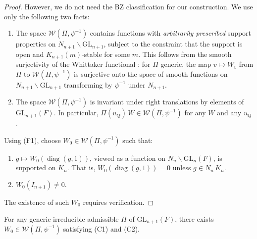 \begin{proof}
However, we do not need the BZ classification for our construction. We use
only the following two facts:
\begin{enumerate}
\item[(F1)] The space $\mathcal{W}(\Pi, \psi^{-1})$ contains functions with
  \emph{arbitrarily prescribed} support properties on $N_{n+1} \backslash \mathrm{GL}_{n+1}$,
  subject to the constraint that the support is open and $K_{n+1}(m)$-stable
  for some $m$. This follows from the smooth surjectivity of the Whittaker
  functional \cite{Shalika74}: for $\Pi$ generic, the map
  $v \mapsto W_v$ from $\Pi$ to $\mathcal{W}(\Pi, \psi^{-1})$ is surjective
  onto the space of smooth functions on $N_{n+1} \backslash \mathrm{GL}_{n+1}$
  transforming by $\psi^{-1}$ under $N_{n+1}$.
\item[(F2)] The space $\mathcal{W}(\Pi, \psi^{-1})$ is invariant under right
  translations by elements of $\mathrm{GL}_{n+1}(F)$. In particular,
  $\Pi(u_Q)\,W \in \mathcal{W}(\Pi, \psi^{-1})$ for any $W$ and any $u_Q$.
\end{enumerate}

Using (F1), choose $W_0 \in \mathcal{W}(\Pi, \psi^{-1})$ such that:
\begin{enumerate}
\item[(C1)] $g \mapsto W_0(\operatorname{diag}(g,1))$, viewed as a function
  on $N_n \backslash \mathrm{GL}_n(F)$, is supported on $K_n$. That is,
  $W_0(\operatorname{diag}(g,1)) = 0$ unless $g \in N_n\,K_n$.
\item[(C2)] $W_0(I_{n+1}) \neq 0$.
\end{enumerate}

The existence of such $W_0$ requires verification.
\end{proof}

\begin{lemma}
\label{lem:compact-whittaker}
For any generic irreducible admissible $\Pi$ of $\mathrm{GL}_{n+1}(F)$,
there exists $W_0 \in \mathcal{W}(\Pi, \psi^{-1})$ satisfying (C1) and (C2).
\end{lemma}

